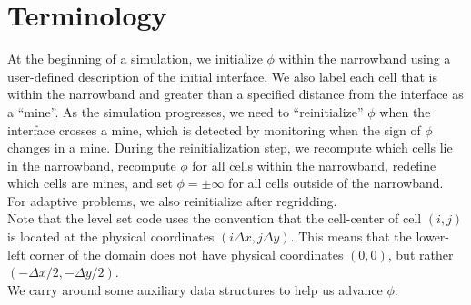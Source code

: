 \section{Terminology}\label{Sec:LevelSet Terminology}
At the beginning of a simulation, we initialize $\phi$ within the narrowband using a user-defined description of the initial interface.  We also label each cell that is within the narrowband and greater than a specified distance from the interface as a ``mine''.  As the simulation progresses, we need to ``reinitialize'' $\phi$ when the interface crosses a mine, which is detected by monitoring when the sign of $\phi$ changes in a mine.  During the reinitialization step, we recompute which cells lie in the narrowband, recompute $\phi$ for all cells within the narrowband, redefine which cells are mines, and set $\phi=\pm\infty$ for all cells outside of the narrowband.  For adaptive problems, we also reinitialize after regridding.\\

Note that the level set code uses the convention that the cell-center of cell $(i,j)$ is located at the physical coordinates $(i\Delta x,j\Delta y)$.  This means that the lower-left corner of the domain does not have physical coordinates $(0,0)$, but rather $(-\Delta x/2,-\Delta y/2)$.\\

We carry around some auxiliary data structures to help us advance $\phi$:

